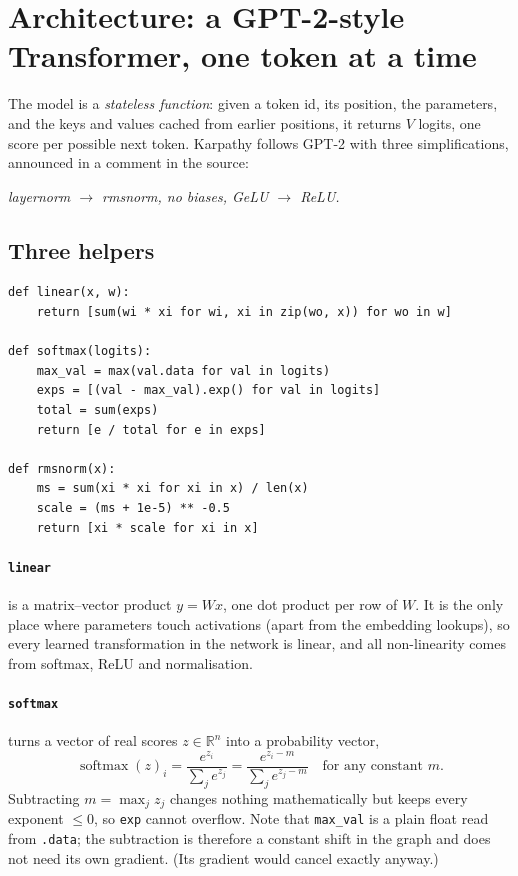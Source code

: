 \documentclass[11pt,letterpaper]{article}
\theoremstyle{remark}
\newcommand{\code}[1]{\lstinline[basicstyle=\ttfamily\small]|#1|}
\newcommand{\R}{\mathbb{R}}
\newcommand{\softmax}{\operatorname{softmax}}
\begin{document}
\section{Architecture: a GPT-2-style Transformer, one token at a time}
\label{sec:arch}

The model is a \emph{stateless function}: given a token id, its position, the parameters, and the keys and values cached from earlier positions, it returns $V$ logits, one score per possible next token. Karpathy follows GPT-2 \parencite{radford2019gpt2} with three simplifications, announced in a comment in the source:
\begin{center}
\emph{layernorm $\to$ rmsnorm, \quad no biases, \quad GeLU $\to$ ReLU.}
\end{center}

\subsection{Three helpers}

\begin{lstlisting}
def linear(x, w):
    return [sum(wi * xi for wi, xi in zip(wo, x)) for wo in w]

def softmax(logits):
    max_val = max(val.data for val in logits)
    exps = [(val - max_val).exp() for val in logits]
    total = sum(exps)
    return [e / total for e in exps]

def rmsnorm(x):
    ms = sum(xi * xi for xi in x) / len(x)
    scale = (ms + 1e-5) ** -0.5
    return [xi * scale for xi in x]
\end{lstlisting}

\paragraph{\code{linear}} is a matrix--vector product $y = Wx$, one dot product per row of $W$. It is the only place where parameters touch activations (apart from the embedding lookups), so every learned transformation in the network is linear, and all non-linearity comes from softmax, ReLU and normalisation.

\paragraph{\code{softmax}} turns a vector of real scores $z\in\R^n$ into a probability vector,
\begin{equation}
\softmax(z)_i = \frac{e^{z_i}}{\sum_j e^{z_j}} = \frac{e^{z_i - m}}{\sum_j e^{z_j - m}}\quad\text{for any constant } m.
\end{equation}
Subtracting $m=\max_j z_j$ changes nothing mathematically but keeps every exponent $\le 0$, so \code{exp} cannot overflow. Note that \code{max_val} is a plain float read from \code{.data}; the subtraction is therefore a constant shift in the graph and does not need its own gradient. (Its gradient would cancel exactly anyway.)
\end{document}
